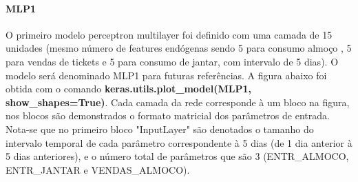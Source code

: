               \paragraph{MLP1}
    	        O primeiro modelo perceptron multilayer foi definido com uma camada de 15 unidades (mesmo número de features endógenas sendo 5 para consumo almoço , 5 para vendas de tickets e 5 para consumo de jantar, com intervalo de 5 dias).
    	        O modelo será denominado MLP1 para futuras referências. A figura abaixo foi obtida com o comando \textbf{keras.utils.plot\_model(MLP1, show\_shapes=True)}. Cada camada da rede corresponde à um bloco na figura, nos blocos são demonstrados o formato matricial dos parâmetros de  entrada. Nota-se que no primeiro bloco "InputLayer" são denotados o tamanho do intervalo temporal de cada parâmetro correspondente à 5 dias (de 1 dia anterior à 5 dias anteriores), e o número total de parâmetros que são 3 (ENTR\_ALMOCO, ENTR\_JANTAR e VENDAS\_ALMOCO).
    	        \begin{figure}[H]
                \end{figure}
                \begin{figure}[H]
                \end{figure}
    	        
